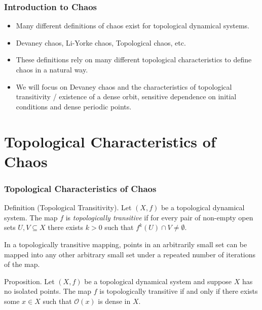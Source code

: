 \documentclass{beamer}
\begin{document}
\begin{frame}
    \frametitle{Introduction to Chaos}
    \begin{itemize}
        \item Many different definitions of chaos exist for topological dynamical systems.
        \item Devaney chaos, Li-Yorke chaos, Topological chaos, etc.
        \item These definitions rely on many different topological characteristics to define chaos in a natural way.
        \item We will focus on Devaney chaos and the characteristics of topological transitivity / existence of a dense orbit, sensitive dependence on initial conditions and dense periodic points.
    \end{itemize}
\end{frame}

\section{Topological Characteristics of Chaos}
\begin{frame}
    \frametitle{Topological Characteristics of Chaos}
    \begin{block}{Definition (Topological Transitivity).}
        Let $(X, f)$ be a topological dynamical system. The map $f$ is \emph{topologically transitive} if for every pair of non-empty open sets $U, V \subseteq X$ there exists $k > 0$ such that $f^k(U) \cap V \neq \emptyset$.
    \end{block}
    \vspace{0.3cm}
    In a topologically transitive mapping, points in an arbitrarily small set can be mapped into any other arbitrary small set under a repeated number of iterations of the map.
    \vspace{0.3cm}
    \begin{block}{Proposition.}
        Let $(X, f)$ be a topological dynamical system and suppose $X$ has no isolated points. The map $f$ is topologically transitive if and only if there exists some $x \in X$ such that $\mathcal{O}(x)$ is dense in $X$. \cite{silverman}
    \end{block}
\end{frame}
\end{document}
